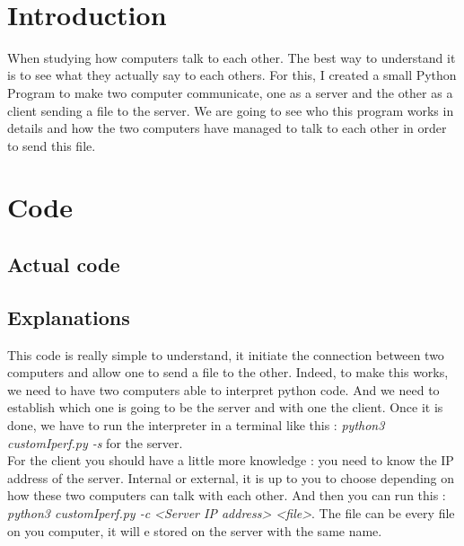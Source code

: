 \documentclass[a4paper]{article}
\title{\underline{\textbf{\begin{Huge}Network\end{Huge}}}\\\vspace{1cm}
    \begin{huge}
        \textbf{Client / Server communication study}
    \end{huge}\\}
\author{
        Tom Moulard (16920041)
        \date{}
        }
\begin{document}
\maketitle
\begin{center}
\vspace{1cm}
\date{2017 June 12}
\vspace{2cm}\\
\end{center}    
    \thispagestyle{empty}

\newpage{}

\tableofcontents
\thispagestyle{empty}


\newpage
\section{Introduction}

When studying how computers talk to each other. The best way to understand it is to see what they actually say to each others.
For this, I created a small Python Program to make two computer communicate, one as a server and the other as a client sending a file to the server.
We are going to see who this program works in details and how the two computers have managed to talk to each other in order to send this file.  


\section{Code}

\subsection{Actual code}


\subsection{Explanations}
This code is really simple to understand, it initiate the connection between two computers and allow one to send a file to the other.
Indeed, to make this works, we need to have two computers able to interpret python code.
And we need to establish which one is going to be the server and with one the client.
Once it is done, we have to run the interpreter in a terminal like this : \textit{python3 customIperf.py -s} for the server.\\
For the client you should have a little more knowledge : you need to know the IP address of the server. Internal or external, it is up to you to choose depending on how these two computers can talk with each other. And then you can run this : \textit{python3 customIperf.py -c <Server IP address> <file>}. The file can be every file on you computer, it will e stored on the server with the same name.
\end{document}
